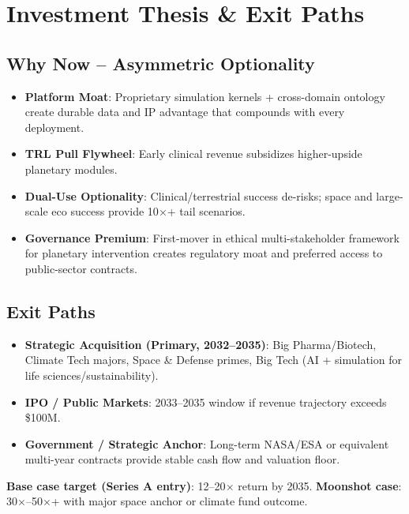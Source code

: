 \documentclass[11pt,a4paper]{article}
\begin{document}
\section{Investment Thesis \& Exit Paths}

\subsection{Why Now -- Asymmetric Optionality}
\begin{itemize}
    \item \textbf{Platform Moat}: Proprietary simulation kernels + cross-domain ontology create durable data and IP advantage that compounds with every deployment.
    \item \textbf{TRL Pull Flywheel}: Early clinical revenue subsidizes higher-upside planetary modules.
    \item \textbf{Dual-Use Optionality}: Clinical/terrestrial success de-risks; space and large-scale eco success provide 10$\times$+ tail scenarios.
    \item \textbf{Governance Premium}: First-mover in ethical multi-stakeholder framework for planetary intervention creates regulatory moat and preferred access to public-sector contracts.
\end{itemize}

\subsection{Exit Paths}
\begin{itemize}
    \item \textbf{Strategic Acquisition (Primary, 2032--2035)}: Big Pharma/Biotech, Climate Tech majors, Space \& Defense primes, Big Tech (AI + simulation for life sciences/sustainability).
    \item \textbf{IPO / Public Markets}: 2033--2035 window if revenue trajectory exceeds \$100M.
    \item \textbf{Government / Strategic Anchor}: Long-term NASA/ESA or equivalent multi-year contracts provide stable cash flow and valuation floor.
\end{itemize}

\textbf{Base case target (Series A entry)}: 12--20$\times$ return by 2035. \textbf{Moonshot case}: 30$\times$--50$\times$+ with major space anchor or climate fund outcome.
\end{document}
